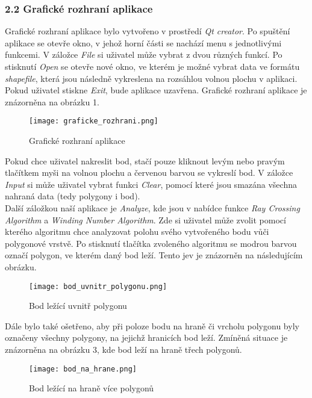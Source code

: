 \subsubsection*{2.2 Grafické rozhraní aplikace}
\noindent Grafické rozhraní aplikace bylo vytvořeno v prostředí \textit{Qt creator}. Po spuštění aplikace se otevře okno, v jehož horní části se nachází menu s jednotlivými funkcemi. V záložce \textit{File} si uživatel může vybrat z dvou různých funkcí. Po stisknutí \textit{Open} se otevře nové okno, ve kterém je možné vybrat data ve formátu \textit{shapefile}, která jsou následně vykreslena na rozsáhlou volnou plochu v aplikaci. Pokud uživatel stiskne \textit{Exit}, bude aplikace uzavřena. Grafické rozhraní aplikace je znázorněna na obrázku 1.\\

\begin{figure}[H]
    \centering
    \texttt{[image: graficke\_rozhrani.png]}
    \caption{Grafické rozhraní aplikace}
    \label{fig:enter-label}
\end{figure}

\noindent Pokud chce uživatel nakreslit bod, stačí pouze kliknout levým nebo pravým tlačítkem myši na volnou plochu a červenou barvou se vykreslí bod. V záložce \textit{Input} si může uživatel vybrat funkci \textit{Clear}, pomocí které jsou smazána všechna nahraná data (tedy polygony i bod).\\

\noindent Další záložkou naší aplikace je \textit{Analyze}, kde jsou v nabídce funkce \textit{Ray Crossing Algorithm} a \textit{Winding Number Algorithm}. Zde si uživatel může zvolit pomocí kterého algoritmu chce analyzovat polohu svého vytvořeného bodu vůči polygonové vrstvě. Po stisknutí tlačítka zvoleného algoritmu se modrou barvou označí polygon, ve kterém daný bod leží. Tento jev je znázorněn na následujícím obrázku.

\begin{figure}[H]
    \centering
    \texttt{[image: bod\_uvnitr\_polygonu.png]}
    \caption{Bod ležící uvnitř polygonu}
    \label{fig:enter-label}
\end{figure}

\noindent Dále bylo také ošetřeno, aby při poloze bodu na hraně či vrcholu polygonu byly označeny všechny polygony, na jejichž hranicích bod leží. Zmíněná situace je znázorněna na obrázku 3, kde bod leží na hraně třech polygonů.

\begin{figure}[H]
    \centering
    \texttt{[image: bod\_na\_hrane.png]}
    \caption{Bod ležící na hraně více polygonů}
    \label{fig:enter-label}
\end{figure}

